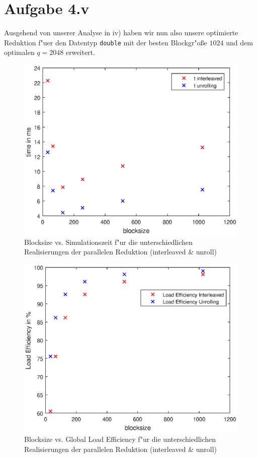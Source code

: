 \documentclass[%
	paper=A4,	%
	pagesize,	%
	DIV=calc,	%
	smallheadings,	%
	ngerman		%
]{scrartcl}
\begin{document}
\section*{Aufgabe 4.v}
Ausgehend von unserer Analyse in iv) haben wir nun also unsere optimierte Reduktion f"uer den Datentyp \texttt{double} mit der besten Blockgr"o\ss e $1024$ und dem optimalen $q=2048$ erweitert.


\begin{figure}
  \centering
  \includegraphics[width=.8\textwidth]{blocksize_vs_time_interl_unroll.eps}
  \caption{Blocksize vs. Simulationszeit f"ur die unterschiedlichen Realisierungen der parallelen Reduktion (interleaved \& unroll)}
\end{figure}

\begin{figure}
  \centering
  \includegraphics[width=.8\textwidth]{blocksize_vs_load_efficiency.eps}
  \caption{Blocksize vs. Global Load Efficiency f"ur die unterschiedlichen Realisierungen der parallelen Reduktion (interleaved \& unroll)}
\end{figure}
\end{document}
